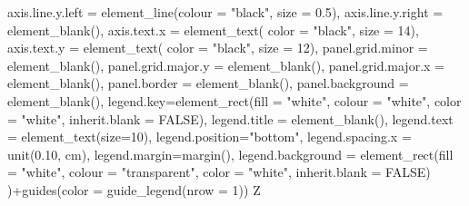 \documentclass[
]{book}
\newenvironment{Shaded}{\begin{snugshade}}{\end{snugshade}}
\newcommand{\AttributeTok}[1]{\textcolor[rgb]{0.77,0.63,0.00}{#1}}
\newcommand{\ConstantTok}[1]{\textcolor[rgb]{0.00,0.00,0.00}{#1}}
\newcommand{\DecValTok}[1]{\textcolor[rgb]{0.00,0.00,0.81}{#1}}
\newcommand{\FloatTok}[1]{\textcolor[rgb]{0.00,0.00,0.81}{#1}}
\newcommand{\FunctionTok}[1]{\textcolor[rgb]{0.00,0.00,0.00}{#1}}
\newcommand{\NormalTok}[1]{#1}
\newcommand{\SpecialCharTok}[1]{\textcolor[rgb]{0.00,0.00,0.00}{#1}}
\newcommand{\StringTok}[1]{\textcolor[rgb]{0.31,0.60,0.02}{#1}}
\begin{document}
\begin{Shaded}
\begin{Highlighting}[]
           \AttributeTok{axis.line.y.left  =} \FunctionTok{element\_line}\NormalTok{(}\AttributeTok{colour =} \StringTok{"black"}\NormalTok{, }\AttributeTok{size =} \FloatTok{0.5}\NormalTok{),}
           \AttributeTok{axis.line.y.right =} \FunctionTok{element\_blank}\NormalTok{(),}
           \AttributeTok{axis.text.x =} \FunctionTok{element\_text}\NormalTok{( }\AttributeTok{color =} \StringTok{"black"}\NormalTok{, }\AttributeTok{size =} \DecValTok{14}\NormalTok{),}
           \AttributeTok{axis.text.y =} \FunctionTok{element\_text}\NormalTok{( }\AttributeTok{color =} \StringTok{"black"}\NormalTok{, }\AttributeTok{size =} \DecValTok{12}\NormalTok{),}
           \AttributeTok{panel.grid.minor =} \FunctionTok{element\_blank}\NormalTok{(),}
           \AttributeTok{panel.grid.major.y =} \FunctionTok{element\_blank}\NormalTok{(),}
           \AttributeTok{panel.grid.major.x =} \FunctionTok{element\_blank}\NormalTok{(),}
           \AttributeTok{panel.border =} \FunctionTok{element\_blank}\NormalTok{(),}
           \AttributeTok{panel.background =} \FunctionTok{element\_blank}\NormalTok{(),}
           \AttributeTok{legend.key=}\FunctionTok{element\_rect}\NormalTok{(}\AttributeTok{fill =} \StringTok{"white"}\NormalTok{, }\AttributeTok{colour =} \StringTok{"white"}\NormalTok{,}
                                   \AttributeTok{color =} \StringTok{"white"}\NormalTok{, }\AttributeTok{inherit.blank =} \ConstantTok{FALSE}\NormalTok{),}
           \AttributeTok{legend.title =} \FunctionTok{element\_blank}\NormalTok{(),}
           \AttributeTok{legend.text  =} \FunctionTok{element\_text}\NormalTok{(}\AttributeTok{size=}\DecValTok{10}\NormalTok{),}
           \AttributeTok{legend.position=}\StringTok{"bottom"}\NormalTok{,}
           \AttributeTok{legend.spacing.x =} \FunctionTok{unit}\NormalTok{(}\FloatTok{0.10}\NormalTok{, }\StringTok{\textquotesingle{}cm\textquotesingle{}}\NormalTok{),}
           \AttributeTok{legend.margin=}\FunctionTok{margin}\NormalTok{(),}
           \AttributeTok{legend.background =} \FunctionTok{element\_rect}\NormalTok{(}\AttributeTok{fill =} \StringTok{"white"}\NormalTok{, }\AttributeTok{colour =} \StringTok{"transparent"}\NormalTok{,}
                                            \AttributeTok{color =} \StringTok{"white"}\NormalTok{, }\AttributeTok{inherit.blank =} \ConstantTok{FALSE}\NormalTok{)}
\NormalTok{)}\SpecialCharTok{+}\FunctionTok{guides}\NormalTok{(}\AttributeTok{color =} \FunctionTok{guide\_legend}\NormalTok{(}\AttributeTok{nrow =} \DecValTok{1}\NormalTok{))}
\NormalTok{Z}
\end{Highlighting}
\end{Shaded}
\end{document}
